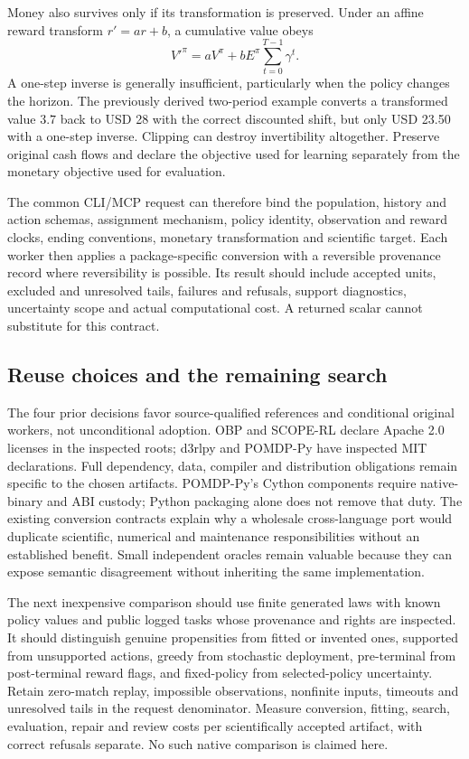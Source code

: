 Money also survives only if its transformation is preserved. Under an affine
reward transform $r'=ar+b$, a cumulative value obeys
\[
 V'^\pi=aV^\pi+bE^\pi\sum_{t=0}^{T-1}\gamma^t.
\]
A one-step inverse is generally insufficient, particularly when the policy
changes the horizon. The previously derived two-period example converts a
transformed value $3.7$ back to USD 28 with the correct discounted shift, but
only USD 23.50 with a one-step inverse. Clipping can destroy invertibility
altogether. Preserve original cash flows and declare the objective used for
learning separately from the monetary objective used for evaluation.
\citep{exec15_d3rlpy_value,exec15_d3rlpy_exact}

The common CLI/MCP request can therefore bind the population, history and action
schemas, assignment mechanism, policy identity, observation and reward clocks,
ending conventions, monetary transformation and scientific target. Each worker
then applies a package-specific conversion with a reversible provenance record
where reversibility is possible. Its result should include accepted units,
excluded and unresolved tails, failures and refusals, support diagnostics,
uncertainty scope and actual computational cost. A returned scalar cannot
substitute for this contract.

\subsection{Reuse choices and the remaining search}

The four prior decisions favor source-qualified references and conditional
original workers, not unconditional adoption. OBP and SCOPE-RL declare Apache
2.0 licenses in the inspected roots; d3rlpy and POMDP-Py have inspected MIT
declarations. Full dependency, data, compiler and distribution obligations
remain specific to the chosen artifacts. POMDP-Py's Cython components require
native-binary and ABI custody; Python packaging alone does not remove that duty.
The existing conversion contracts explain why a wholesale cross-language port
would duplicate scientific, numerical and maintenance responsibilities without
an established benefit. Small independent oracles remain valuable because they
can expose semantic disagreement without inheriting the same implementation.
\citep{exec23_obp_sources,exec23_scope_rl_sources,exec15_d3rlpy_package,
exec15_d3rlpy_contract,exec23_pomdppy_sources}

The next inexpensive comparison should use finite generated laws with known
policy values and public logged tasks whose provenance and rights are inspected.
It should distinguish genuine propensities from fitted or invented ones, supported
from unsupported actions, greedy from stochastic deployment, pre-terminal from
post-terminal reward flags, and fixed-policy from selected-policy uncertainty.
Retain zero-match replay, impossible observations, nonfinite inputs, timeouts
and unresolved tails in the request denominator. Measure conversion, fitting,
search, evaluation, repair and review costs per scientifically accepted artifact,
with correct refusals separate. No such native comparison is claimed here.

